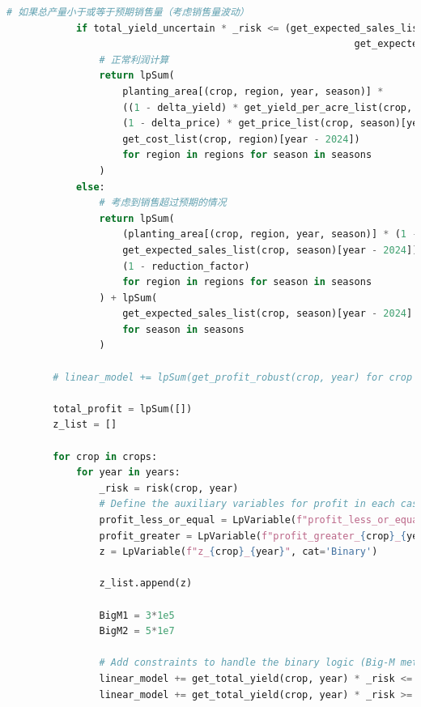 \documentclass[withoutpreface]{cumcmthesis}
\begin{document}
\begin{appendices}
\begin{lstlisting}[language=python]
            # 如果总产量小于或等于预期销售量（考虑销售量波动）
            if total_yield_uncertain * _risk <= (get_expected_sales_list(crop, '第一季')[year - 2024] * (1 - delta_sales) +
                                                            get_expected_sales_list(crop, '第二季')[year - 2024] * (1 - delta_sales)):
                # 正常利润计算
                return lpSum(
                    planting_area[(crop, region, year, season)] *
                    ((1 - delta_yield) * get_yield_per_acre_list(crop, region)[year - 2024] * 
                    (1 - delta_price) * get_price_list(crop, season)[year - 2024] * _risk -
                    get_cost_list(crop, region)[year - 2024])
                    for region in regions for season in seasons
                )
            else:
                # 考虑到销售超过预期的情况
                return lpSum(
                    (planting_area[(crop, region, year, season)] * (1 - delta_yield) * get_yield_per_acre_list(crop, region)[year - 2024] -
                    get_expected_sales_list(crop, season)[year - 2024]) * (1 - delta_price) * get_price_list(crop, season)[year - 2024] *
                    (1 - reduction_factor)
                    for region in regions for season in seasons
                ) + lpSum(
                    get_expected_sales_list(crop, season)[year - 2024] * (1 - delta_price) * get_price_list(crop, season)[year - 2024]
                    for season in seasons
                )
    
        # linear_model += lpSum(get_profit_robust(crop, year) for crop in crops for year in years)
    
        total_profit = lpSum([])
        z_list = []
    
        for crop in crops:
            for year in years:
                _risk = risk(crop, year)
                # Define the auxiliary variables for profit in each case
                profit_less_or_equal = LpVariable(f"profit_less_or_equal_{crop}_{year}", lowBound=0)
                profit_greater = LpVariable(f"profit_greater_{crop}_{year}", lowBound=0)
                z = LpVariable(f"z_{crop}_{year}", cat='Binary')
    
                z_list.append(z)
    
                BigM1 = 3*1e5
                BigM2 = 5*1e7
    
                # Add constraints to handle the binary logic (Big-M method)
                linear_model += get_total_yield(crop, year) * _risk <= get_expected_sales_list(crop, '第一季')[year-2024] + get_expected_sales_list(crop, '第二季')[year-2024] + BigM1 * (1 - z)
                linear_model += get_total_yield(crop, year) * _risk >= get_expected_sales_list(crop, '第一季')[year-2024] + get_expected_sales_list(crop, '第二季')[year-2024] - BigM1 * z
    

\end{lstlisting}
\end{appendices}
\end{document}
